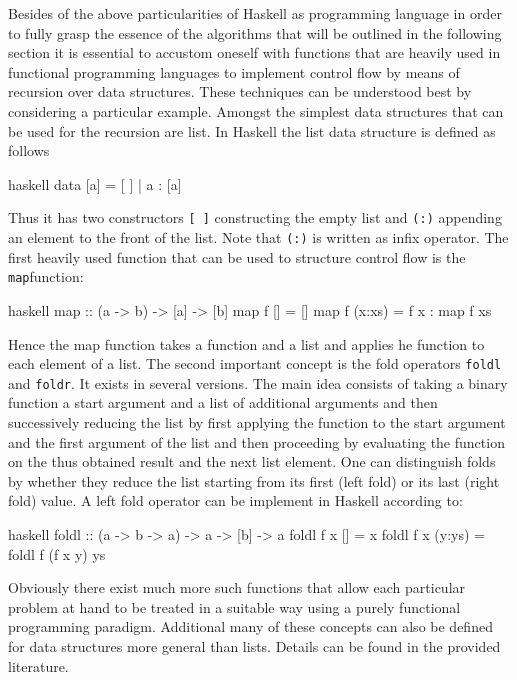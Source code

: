 \documentclass[a4paper,12pt, DIV=14, BCOR=5mm, twoside, headsepline]{scrbook}
\begin{document}
Besides of the above particularities of Haskell as programming language in order to fully grasp the essence of the algorithms that will be outlined in the following section it is essential to accustom oneself with functions that are heavily used in functional programming languages to implement control flow by means of recursion over data structures. These techniques can be understood best by considering a particular example. Amongst the simplest data structures that can be used for the recursion are list. In Haskell the list data structure is defined as follows 
\begin{center}
\begin{cminted}{haskell}
data [a] = [ ] | a : [a] 
\end{cminted}
\end{center}
Thus it has two constructors \texttt{[ ]} constructing the empty list and \texttt{(:)} appending an element to the front of the list. Note that \texttt{(:)} is written as infix operator.
The first heavily used function that can be used to structure control flow is the \texttt{map}function:
\begin{center}
\begin{cminted}{haskell}
map :: (a -> b) -> [a] -> [b]
map f [] = [] 
map f (x:xs) =  f x : map f xs 
\end{cminted}
\end{center}
Hence the map function takes a function and a list and applies he function to each element of a list. The second important concept is the fold operators \texttt{foldl} and \texttt{foldr}. It exists in several versions. The main idea consists of taking a binary function a start argument and a list of additional arguments and then successively reducing the list by first applying the function to the start argument and the first argument of the list and then proceeding by evaluating the function on the thus obtained result and the next list element. One can distinguish folds by whether they reduce the list starting from its first (left fold) or its last (right fold) value. A left fold operator can be implement in Haskell according to:
\begin{center}
\begin{cminted}{haskell}
foldl :: (a -> b -> a) -> a -> [b] -> a 
foldl f x [] = x 
foldl f x (y:ys) = foldl f (f x y) ys
\end{cminted}
\end{center}
Obviously there exist much more such functions that allow each particular problem at hand to be treated in a suitable way using a purely functional programming paradigm. Additional many of these concepts can also be defined for data structures more general than lists. Details can be found in the provided literature.
\end{document}
